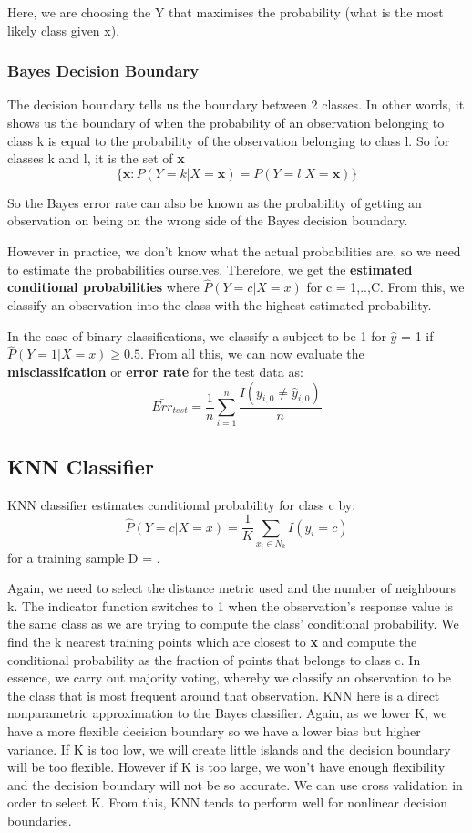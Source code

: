 \documentclass[11pt, oneside]{article}
\def\dataset{\text{$\{(y_i, {\bm{x_i}})\}_{i=1}^N$}}
\theoremstyle{definition}
\begin{document}
Here, we are choosing the Y that maximises the probability (what is the most likely class given x).
\subsubsection{Bayes Decision Boundary}
The decision boundary tells us the boundary between 2 classes. In other words, it shows us the boundary of when the probability of an observation belonging to class k is equal to the probability of the observation belonging to class l. So for classes k and l, it is the set of \textbf{x}
$$
\{ \bm{x}: P(Y=k|X=\bm{x}) = P(Y=l|X=\bm{x})\}
$$

So the Bayes error rate can also be known as the probability of getting an observation on being on the wrong side of the Bayes decision boundary.

However in practice, we don't know what the actual probabilities are, so we need to estimate the probabilities ourselves. Therefore, we get the \textbf{estimated conditional probabilities} where $\hat{P}(Y=c|X=x)$ for c = 1,..,C. From this, we classify an observation into the class with the highest estimated probability.

In the case of binary classifications, we classify a subject to be 1 for $\hat{y}$ = 1 if $\hat{P}(Y=1|X=x) \geq 0.5.$ From all this, we can now evaluate the \textbf{misclassifcation} or \textbf{error rate} for the test data as:
$$
\bar{Err}_{test} = \frac{1}{n}\sum\limits_{i=1}^{n}\frac{I(y_{i,0}\neq \hat{y}_{i,0})}{n}
$$

\subsection{KNN Classifier}
KNN classifier estimates conditional probability for class c by:
$$
\hat{P}(Y=c|X=x) = \frac{1}{K}\sum\limits_{x_i \in N_k}I(y_i = c)
$$
for a training sample D = \dataset.

Again, we need to select the distance metric used and the number of neighbours k. The indicator function switches to 1 when the observation's response value is the same class as we are trying to compute the class' conditional probability. We find the k nearest training points which are closest to \textbf{x} and compute the conditional probability as the fraction of points that belongs to class c. In essence, we carry out majority voting, whereby we classify an observation to be the class that is most frequent around that observation. KNN here is a direct nonparametric approximation to the Bayes classifier. Again, as we lower K, we have a more flexible decision boundary so we have a lower bias but higher variance. If K is too low, we will create little islands and the decision boundary will be too flexible. However if K is too large, we won't have enough flexibility and the decision boundary will not be so accurate. We can use cross validation in order to select K. From this, KNN tends to perform well for nonlinear decision boundaries.
\end{document}
